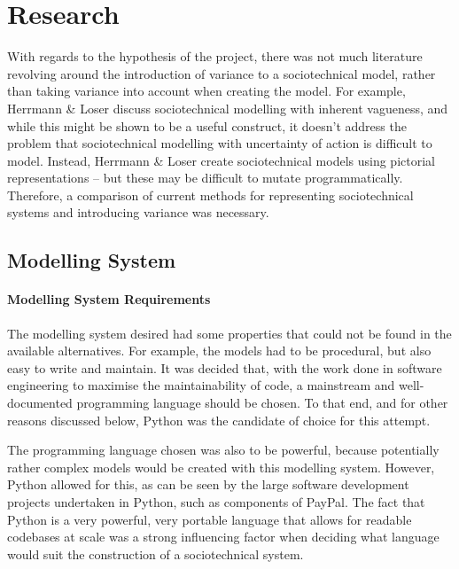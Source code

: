 \chapter{Research}
\label{research_head}
With regards to the hypothesis of the project, there was not much literature revolving around the introduction of variance to a sociotechnical model, rather than taking variance into account when creating the model. For example, Herrmann \& Loser\cite{Herrmann1999} discuss sociotechnical modelling with inherent vagueness, and while this might be shown to be a useful construct, it doesn't address the problem that sociotechnical modelling with uncertainty of action is difficult to model. Instead, Herrmann \& Loser create sociotechnical models using pictorial representations -- but these may be difficult to mutate programmatically. Therefore, a comparison of current methods for representing sociotechnical systems and introducing variance was necessary. \par

\section{Modelling System}\label{planning_modelling}
\subsubsection{Modelling System Requirements}\label{planning_modelling_requirements}
The modelling system desired had some properties that could not be found in the available alternatives. For example, the models had to be procedural, but also easy to write and maintain. It was decided that, with the work done in software engineering to maximise the maintainability of code, a mainstream and well-documented programming language should be chosen. To that end, and for other reasons discussed below, Python was the candidate of choice for this attempt. \par

The programming language chosen was also to be powerful, because potentially rather complex models would be created with this modelling system. However, Python allowed for this, as can be seen by the large software development projects undertaken in Python, such as components of PayPal\cite{Enter95:online}. The fact that Python is a very powerful, very portable language that allows for readable codebases at scale was a strong influencing factor when deciding what language would suit the construction of a sociotechnical system. \par%

